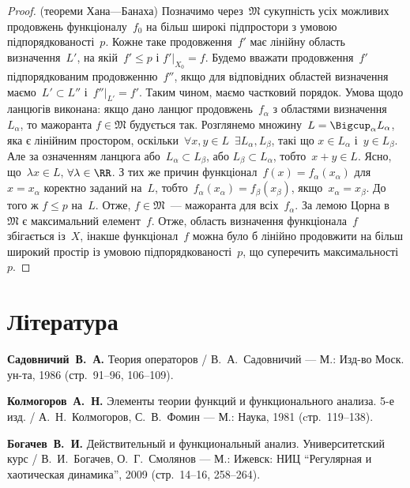 \begin{proof}(теореми Хана---Банаха)
Позначимо через~$\mathfrak{M}$ сукупність усіх можливих
продовжень функціоналу~$f_0$ на більш широкі підпростори з
умовою підпорядкованості~$p$. Кожне таке продовження~$f'$
має лінійну область визначення~$L'$, на якій~$f' \le p$ і
$f'|_{X_0} = f$. Будемо вважати продовження~$f'$ підпорядкованим
продовженню~$f''$, якщо для відповідних областей визначення
маємо~$L' \subset L''$ і~$f''|_{L'} = f'$. Таким чином, маємо частковий
порядок. Умова щодо ланцюгів виконана: якщо дано ланцюг
продовжень~$f_\alpha$ з областями визначення~$L_\alpha$, то мажоранта
$f \in \mathfrak{M}$ будується так.
Розглянемо множину~$L = \Bigcup_\alpha L_\alpha$, яка є
лінійним простором, оскільки~$\forall x, y \in L$~$\exists L_\alpha, L_\beta$, такі що
$x \in L_\alpha$ і~$y \in L_\beta$.
Але за означенням ланцюга або~$L_\alpha \subset L_\beta$, або
$L_\beta \subset L_\alpha$, тобто~$x + y \in L$.
Ясно, що~$\lambda x \in L$, $\forall \lambda \in \RR$. З тих же
причин функціонал~$f(x) = f_\alpha(x_\alpha)$ для~$x = x_\alpha$ коректно
заданий на~$L$, тобто~$f_\alpha(x_\alpha) = f_\beta(x_\beta)$,
якщо~$x_\alpha = x_\beta$. До того ж
$f \le p$ на~$L$. Отже, $f \in \mathfrak{M}$~--- мажоранта для всіх~$f_\alpha$. За
лемою Цорна в~$\mathfrak{M}$ є максимальний елемент~$f$. Отже,
область визначення функціонала~$f$ збігається із~$X$, інакше
функціонал~$f$ можна було б лінійно продовжити на більш
широкий простір із умовою підпорядкованості~$p$, що
суперечить максимальності~$p$.
\end{proof}


\section{Література}

\begin{enumerate}[label={[\arabic*]}]
\item \textbf{Садовничий~В.~А.}
Теория операторов /
В.~А.~Садовничий ---
М.: Изд-во Моск. ун-та, 1986 (стр.~91--96, 106--109).
\item \textbf{Колмогоров~А.~Н.}
Элементы теории функций и функционального анализа. 5-е изд. /
А.~Н.~Колмогоров, С.~В.~Фомин ---
М.: Наука, 1981 (cтр.~119--138).
\item \textbf{Богачев~В.~И.}
Действительный и функциональный анализ. Университетский курс /
В.~И.~Богачев, О.~Г.~Смолянов ---
М.: Ижевск: НИЦ ``Регулярная и хаотическая динамика'', 2009 (стр.~14--16, 258--264).
\end{enumerate}
